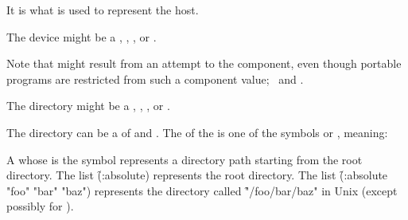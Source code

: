 
It is  what  is used to represent the host. 

\endsubsubsubsection%


The device might be a ,
, , or \nil.

Note that  might result from an attempt to 
the  component, even though portable programs are restricted
from  such a component value; 
\seesection\WildcardRestrictions\ and \secref\ConstructingPathnames.

\endsubsubsubsection%


The directory might be a ,
%
, , or \nil.

The directory can be a  of  and . 
The  of the  is one of the symbols  or 
, meaning:

\beginlist

\item{}

  A  whose  is the symbol  represents 
  a directory path starting from the root directory.  The list 
  \f{(:absolute)} represents the root directory.  The list 
  \f{(:absolute "foo" "bar" "baz")} represents the directory called
  \f{"/foo/bar/baz"} in Unix (except possibly for ).
 
